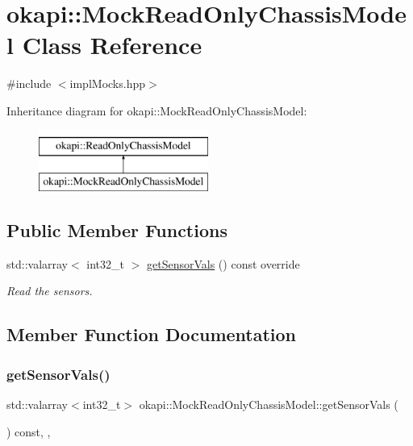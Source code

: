 \hypertarget{classokapi_1_1MockReadOnlyChassisModel}{}\section{okapi\+::Mock\+Read\+Only\+Chassis\+Model Class Reference}
\label{classokapi_1_1MockReadOnlyChassisModel}


{\ttfamily \#include $<$impl\+Mocks.\+hpp$>$}

Inheritance diagram for okapi\+::Mock\+Read\+Only\+Chassis\+Model\+:\begin{figure}[H]
\begin{center}
\leavevmode
\includegraphics[height=2.000000cm]{classokapi_1_1MockReadOnlyChassisModel}
\end{center}
\end{figure}
\subsection*{Public Member Functions}
\begin{DoxyCompactItemize}
\item 
std\+::valarray$<$ int32\+\_\+t $>$ \mbox{\hyperlink{classokapi_1_1MockReadOnlyChassisModel_aa593b75526c78bff0c3ec6bcc6f7f716}{get\+Sensor\+Vals}} () const override
\begin{DoxyCompactList}\small\item\em Read the sensors. \end{DoxyCompactList}\end{DoxyCompactItemize}


\subsection{Member Function Documentation}
\mbox{\label{classokapi_1_1MockReadOnlyChassisModel_aa593b75526c78bff0c3ec6bcc6f7f716}} 
\subsubsection{\texorpdfstring{getSensorVals()}{getSensorVals()}}
{\footnotesize\ttfamily std\+::valarray$<$int32\+\_\+t$>$ okapi\+::\+Mock\+Read\+Only\+Chassis\+Model\+::get\+Sensor\+Vals (\begin{DoxyParamCaption}{ }\end{DoxyParamCaption}) const\hspace{0.3cm}{\ttfamily [inline]}, {\ttfamily [override]}, {\ttfamily [virtual]}}



